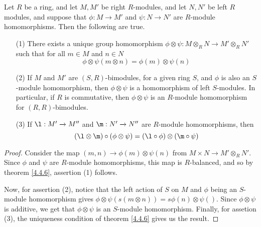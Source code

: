 \begin{theorem}\label{4.4.8}
    Let $R$ be a ring, and let $M,M'$ be right  $R$-modules, and let  $N,N'$ be
    left  $R$ modules, and suppose that $\phi:M \xrightarrow{} M'$ and $\psi:N
    \xrightarrow{} N'$ are $R$-module homomorphisms. Then the following are
    true.
    \begin{enumerate}
        \item[(1)] There exists a unique group homomorphism $\phi \otimes \psi:
            M \otimes_R N \xrightarrow{} M' \otimes_R N'$ such that for all $m
            \in M$ and $n \in N$
            \begin{equation*}
                \phi \otimes \psi(m \otimes n)=\phi(m) \otimes \psi(n)
            \end{equation*}

        \item[(2)] If $M$ and $M'$ are  $(S,R)$-bimodules, for a given ring $S$,
            and  $\phi$ is also an  $S$-module homomorphism, then $\phi \otimes
            \psi$ is a homomorphism of left $S$-modules. In particular, if  $R$
            is commutative, then  $\phi \otimes \psi$ is an  $R$-module
            homomorphism for  $(R,R)$-bimodules.

        \item[(3)] If $\l:M' \xrightarrow{} M''$ and $\m:N' \xrightarrow{} N''$
            are $R$-module homomorphisms, then
            \begin{equation*}
                (\l \otimes \m) \circ (\phi \otimes \psi)=
                (\l \circ \phi) \otimes (\m \circ \psi)
            \end{equation*}
    \end{enumerate}
\end{theorem}
\begin{proof}
    Consider the map $(m,n) \xrightarrow{} \phi(m) \otimes \psi(n)$ from $M
    \times N \xrightarrow{} M' \otimes_R N'$. Since $\phi$ and $\psi$ are
    $R$-module homomorphisms, this map is  $R$-balanced, and so by theorem
    \ref{4.4.6}, assertion (1) follows.

    Now, for assertion (2), notice that the left action of $S$ on $M$ and
    $\phi$ being an $S$-module homomorphism gives  $\phi \otimes \psi(s(m
    \otimes n))=s\phi(n) \otimes \psi()$. Since $\phi \otimes \psi$ is additive,
    we get that  $\phi \otimes \psi$ is an  $S$-module homomorphism. Finally,
    for assetion (3), the uniqueness condition of theorem \ref{4.4.6} gives us
    the result.
\end{proof}


